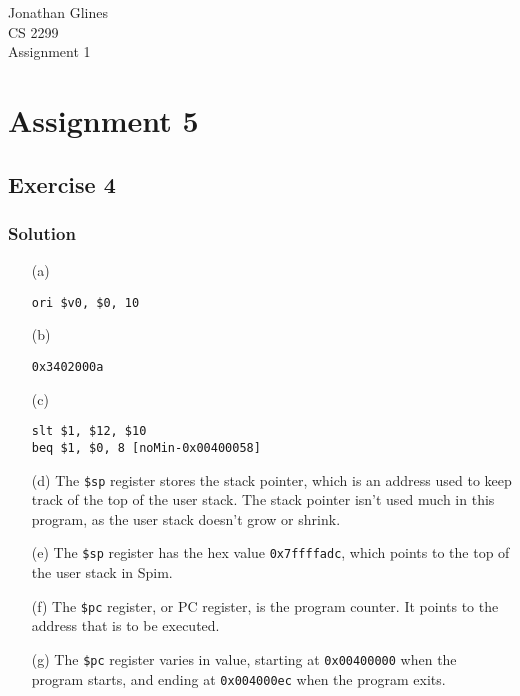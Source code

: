 \documentclass[12pt]{article}
\begin{document}
\begin{flushright}
{\Large Jonathan Glines \\
CS 2299 \\
Assignment 1 \\
}
\end{flushright}
\section*{Assignment 5}
\subsection*{Exercise 4}
\subsubsection*{Solution}
\begin{itemize}
\item[(a)] \begin{verbatim}ori $v0, $0, 10\end{verbatim}
\item[(b)] \begin{verbatim}0x3402000a\end{verbatim}
\item[(c)] \begin{verbatim}
slt $1, $12, $10
beq $1, $0, 8 [noMin-0x00400058]
\end{verbatim}
\item[(d)] The {\tt \$sp} register stores the stack pointer, which is an address used to keep track of the top of the user stack. The stack pointer isn't used much in this program, as the user stack doesn't grow or shrink.
\item[(e)] The {\tt \$sp} register has the hex value {\tt 0x7ffffadc}, which points to the top of the user stack in Spim.
\item[(f)] The {\tt \$pc} register, or PC register, is the program counter. It points to the address that is to be executed.
\item[(g)] The {\tt \$pc} register varies in value, starting at {\tt 0x00400000} when the program starts, and ending at {\tt 0x004000ec} when the program exits.
\end{itemize}
\end{document}
